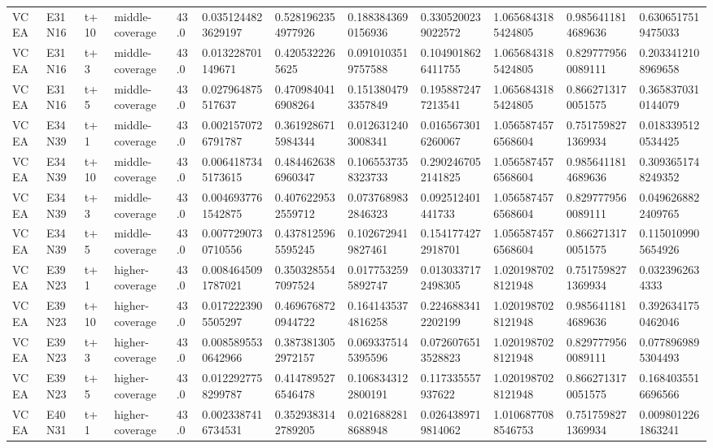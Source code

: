 \begin{landscape}
\begin{longtable}{llllllllllll}
VCEA & E31N16 & t+10 & middle-coverage & 43.0 & 0.0351244823629197 & 0.5281962354977926 & 0.1883843690156936 & 0.3305200239022572 & 1.0656843185424805 & 0.9856411814689636 & 0.6306517519475033 \\
VCEA & E31N16 & t+3 & middle-coverage & 43.0 & 0.013228701149671 & 0.4205322265625 & 0.0910103519757588 & 0.1049018626411755 & 1.0656843185424805 & 0.8297779560089111 & 0.2033412108969658 \\
VCEA & E31N16 & t+5 & middle-coverage & 43.0 & 0.027964875517637 & 0.4709840416908264 & 0.1513804793357849 & 0.1958872477213541 & 1.0656843185424805 & 0.8662713170051575 & 0.3658370310144079 \\
VCEA & E34N39 & t+1 & middle-coverage & 43.0 & 0.0021570726791787 & 0.3619286715984344 & 0.0126312403008341 & 0.0165673016260067 & 1.0565874576568604 & 0.7517598271369934 & 0.0183395120534425 \\
VCEA & E34N39 & t+10 & middle-coverage & 43.0 & 0.0064187345173615 & 0.4844626386960347 & 0.1065537358323733 & 0.2902467052141825 & 1.0565874576568604 & 0.9856411814689636 & 0.3093651748249352 \\
VCEA & E34N39 & t+3 & middle-coverage & 43.0 & 0.0046937761542875 & 0.4076229532559712 & 0.0737689832846323 & 0.092512401441733 & 1.0565874576568604 & 0.8297779560089111 & 0.0496268822409765 \\
VCEA & E34N39 & t+5 & middle-coverage & 43.0 & 0.0077290730710556 & 0.4378125965595245 & 0.1026729419827461 & 0.1541774272918701 & 1.0565874576568604 & 0.8662713170051575 & 0.1150109905654926 \\
VCEA & E39N23 & t+1 & higher-coverage & 43.0 & 0.0084645091787021 & 0.3503285547097524 & 0.0177532595892747 & 0.0130337172498305 & 1.0201987028121948 & 0.7517598271369934 & 0.0323962634333 \\
VCEA & E39N23 & t+10 & higher-coverage & 43.0 & 0.0172223905505297 & 0.4696768720944722 & 0.1641435374816258 & 0.2246883412202199 & 1.0201987028121948 & 0.9856411814689636 & 0.3926341750462046 \\
VCEA & E39N23 & t+3 & higher-coverage & 43.0 & 0.0085895530642966 & 0.3873813052972157 & 0.0693375145395596 & 0.0726076513528823 & 1.0201987028121948 & 0.8297779560089111 & 0.0778969895304493 \\
VCEA & E39N23 & t+5 & higher-coverage & 43.0 & 0.0122927758299787 & 0.4147895276546478 & 0.1068343122800191 & 0.117335557937622 & 1.0201987028121948 & 0.8662713170051575 & 0.1684035516696566 \\
VCEA & E40N31 & t+1 & higher-coverage & 43.0 & 0.0023387416734531 & 0.3529383142789205 & 0.0216882818688948 & 0.0264389719814062 & 1.0106877088546753 & 0.7517598271369934 & 0.0098012261863241 \\

\end{longtable}
\end{landscape}
